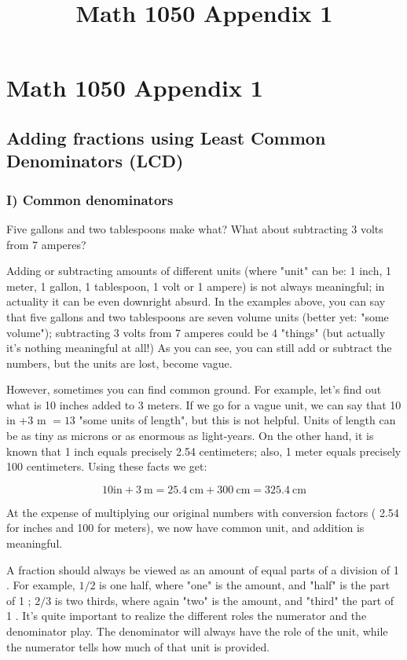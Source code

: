 \documentclass{ximera}
\title{Math 1050 Appendix 1}
\begin{document}
\section{Math 1050 Appendix 1}


\subsection*{Adding fractions using Least Common Denominators (LCD)}
\subsubsection*{I) Common denominators}
Five gallons and two tablespoons make what? What about subtracting 3 volts from 7 amperes?

Adding or subtracting amounts of different units (where "unit" can be: 1 inch, 1 meter, 1 gallon, 1 tablespoon, 1 volt or 1 ampere) is not always meaningful; in actuality it can be even downright absurd. In the examples above, you can say that five gallons and two tablespoons are seven volume units (better yet: "some volume"); subtracting 3 volts from 7 amperes could be 4 "things" (but actually it's nothing meaningful at all!) As you can see, you can still add or subtract the numbers, but the units are lost, become vague.

However, sometimes you can find common ground. For example, let's find out what is 10 inches added to 3 meters. If we go for a vague unit, we can say that 10 in +3 m $=13$ "some units of length", but this is not helpful. Units of length can be as tiny as microns or as enormous as light-years. On the other hand, it is known that 1 inch equals precisely 2.54 centimeters; also, 1 meter equals precisely 100 centimeters. Using these facts we get:

$$10 \mathrm{in}+3 \mathrm{~m}=25.4 \mathrm{~cm}+300 \mathrm{~cm}=325.4 \mathrm{~cm}$$

At the expense of multiplying our original numbers with conversion factors ( 2.54 for inches and 100 for meters), we now have common unit, and addition is meaningful.

A fraction should always be viewed as an amount of equal parts of a division of 1 . For example, $1 / 2$ is one half, where "one" is the amount, and "half" is the part of 1 ; $2 / 3$ is two thirds, where again "two" is the amount, and "third" the part of 1 . It's quite important to realize the different roles the numerator and the denominator play. The denominator will always have the role of the unit, while the numerator tells how much of that unit is provided.
\end{document}
